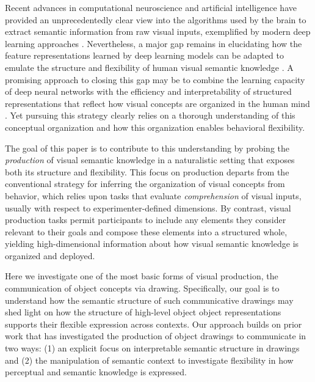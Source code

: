\documentclass[10pt,letterpaper]{article}
\begin{document}
Recent advances in computational neuroscience and artificial intelligence have provided an unprecedentedly clear view into the algorithms used by the brain to extract semantic information from raw visual inputs, exemplified by modern deep learning approaches \cite{yamins2014performance}.
Nevertheless, a major gap remains in elucidating how the feature representations learned by deep learning models can be adapted to emulate the structure and flexibility of human visual semantic knowledge \cite{lake2017building}.
A promising approach to closing this gap may be to combine the learning capacity of deep neural networks with the efficiency and interpretability of structured representations that reflect how visual concepts are organized in the human mind \cite{battaglia2018relational}. 
Yet pursuing this strategy clearly relies on a thorough understanding of this conceptual organization and how this organization enables behavioral flexibility.  

The goal of this paper is to contribute to this understanding by probing the \textit{production} of visual semantic knowledge in a naturalistic setting that exposes both its structure and flexibility.
This focus on production departs from the conventional strategy for inferring the organization of visual concepts from behavior, which relies upon tasks that evaluate \textit{comprehension} of visual inputs, usually with respect to experimenter-defined dimensions. 
By contrast, visual production tasks permit participants to include any elements they consider relevant to their goals and compose these elements into a structured whole, yielding high-dimensional information about how visual semantic knowledge is organized and deployed. 

Here we investigate one of the most basic forms of visual production, the communication of object concepts via drawing.
Specifically, our goal is to understand how the semantic structure of such communicative drawings may shed light on how the structure of high-level object object representations supports their flexible expression across contexts. 
Our approach builds on prior work that has investigated the production of object drawings to communicate \cite{FanCommon2018} in two ways: (1) an explicit focus on interpretable semantic structure in drawings and (2) the manipulation of semantic context to investigate flexibility in how perceptual and semantic knowledge is expressed. 
\end{document}
